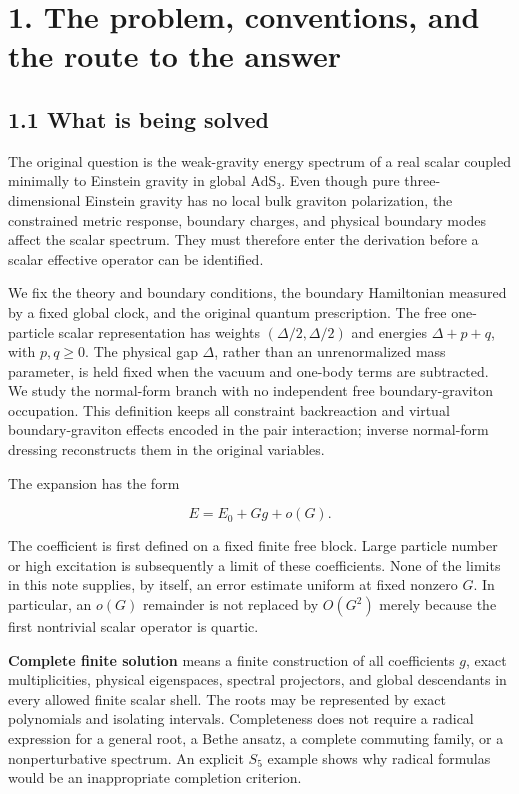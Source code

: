\clearpage
\hypertarget{the-problem-conventions-and-the-route-to-the-answer}{%
\section{1. The problem, conventions, and the route to the answer}\label{the-problem-conventions-and-the-route-to-the-answer}}

\hypertarget{what-is-being-solved}{%
\subsection{1.1 What is being solved}\label{what-is-being-solved}}

The original question is the weak-gravity energy spectrum of a real scalar coupled minimally to Einstein gravity in global AdS₃. Even though pure three-dimensional Einstein gravity has no local bulk graviton polarization, the constrained metric response, boundary charges, and physical boundary modes affect the scalar spectrum. They must therefore enter the derivation before a scalar effective operator can be identified.

We fix the theory and boundary conditions, the boundary Hamiltonian measured by a fixed global clock, and the original quantum prescription. The free one-particle scalar representation has weights \((\Delta/2,\Delta/2)\) and energies \(\Delta+p+q\), with \(p,q\ge0\). The physical gap \(\Delta\), rather than an unrenormalized mass parameter, is held fixed when the vacuum and one-body terms are subtracted. We study the normal-form branch with no independent free boundary-graviton occupation. This definition keeps all constraint backreaction and virtual boundary-graviton effects encoded in the pair interaction; inverse normal-form dressing reconstructs them in the original variables.

The expansion has the form

\[
E=E_0+Gg+o(G).
\tag{1.1}
\]

The coefficient is first defined on a fixed finite free block. Large particle number or high excitation is subsequently a limit of these coefficients. None of the limits in this note supplies, by itself, an error estimate uniform at fixed nonzero \(G\). In particular, an \(o(G)\) remainder is not replaced by \(O(G^2)\) merely because the first nontrivial scalar operator is quartic.

\textbf{Complete finite solution} means a finite construction of all coefficients \(g\), exact multiplicities, physical eigenspaces, spectral projectors, and global descendants in every allowed finite scalar shell. The roots may be represented by exact polynomials and isolating intervals. Completeness does not require a radical expression for a general root, a Bethe ansatz, a complete commuting family, or a nonperturbative spectrum. An explicit \(S_5\) example shows why radical formulas would be an inappropriate completion criterion.

